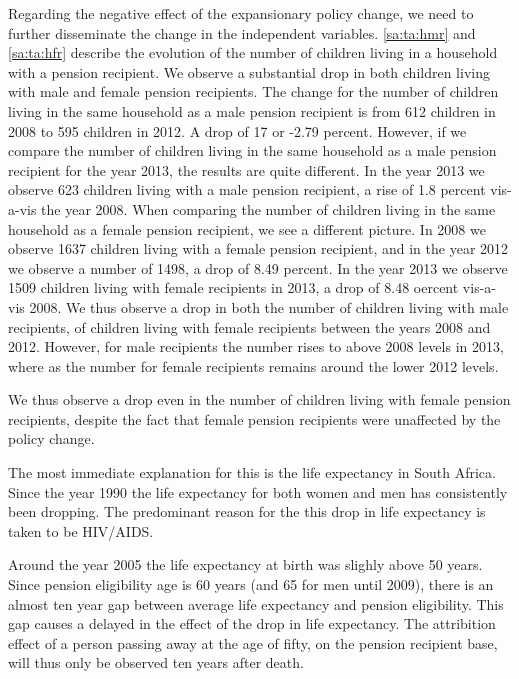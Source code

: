 \begin{refsection}
Regarding the negative effect of the expansionary policy change, we need to further disseminate the change in the independent variables.
\autoref{sa:ta:hmr} and \autoref{sa:ta:hfr} describe the evolution of the number of children living in a household with a pension recipient.
We observe a substantial drop in both children living with male and female pension recipients.
The change for the number of children living in the same household as a male pension recipient is from 612 children in 2008 to 595 children in 2012. A drop of 17 or -2.79 percent.
However, if we compare the number of children living in the same household as a male pension recipient for the year 2013,
the results are quite different.
In the year 2013 we observe 623 children living with a male pension recipient, a rise of 1.8 percent vis-a-vis the year 2008.
When comparing the number of children living in the same household as a female pension recipient, we see a different picture.
In 2008 we observe 1637 children living with a female pension recipient,
and in the year 2012 we observe a number of 1498, a drop of 8.49 percent.
In the year 2013 we observe 1509 children living with female recipients in 2013,
a drop of 8.48 oercent vis-a-vis 2008.
We thus observe a drop in both the number of children living with male recipients,
of children living with female recipients between the years 2008 and 2012.
However, for male recipients the number rises to above 2008 levels in 2013,
where as the number for female recipients remains around the lower 2012 levels.

We thus observe a drop even in the number of children living with female pension recipients,
despite the fact that female pension recipients were unaffected by the policy change.

The most immediate explanation for this is the life expectancy in South Africa.
Since the year 1990 the life expectancy for both women and men has consistently been dropping.
The predominant reason for the this drop in life expectancy is taken to be HIV/AIDS.

Around the year 2005 the life expectancy at birth was slighly above 50 years.
Since pension eligibility age is 60 years (and 65 for men until 2009),
there is an almost ten year gap between average life expectancy and pension eligibility.
This gap causes a delayed in the effect of the drop in life expectancy.
The attribition effect of a person passing away at the age of fifty, on the pension recipient base,
will thus only be observed ten years after death.


\end{refsection}

